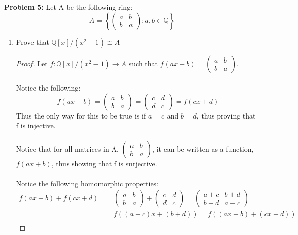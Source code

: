 \documentclass[12pt]{article}
\begin{document}
\noindent \textbf{Problem 5: }Let A be the following ring:
	$$
	A = \left\{
	\begin{pmatrix}
		a & b \\ b & a
	\end{pmatrix}: a,b \in \mathbb{Q}\right\}
	$$
\begin{enumerate}[label = (\alph*)]
	\item Prove that $\mathbb{Q}[x]/(x^2 - 1) \cong A$
	\begin{proof}
		Let $f:\mathbb{Q}[x]/(x^2 - 1) \rightarrow A$ such that $f(ax + b) = \begin{pmatrix}
			a & b \\ b & a
		\end{pmatrix}$.
		\\ \\
		Notice the following:
			$$
			f(ax + b) =
			\begin{pmatrix}
				a & b \\ b & a
			\end{pmatrix} = 
			\begin{pmatrix}
				c & d \\ d & c
			\end{pmatrix} = 
			f(cx + d)
			$$
		Thus the only way for this to be true is if $a=c$ and $b = d$, thus proving that f is injective.
		\\ \\
		Notice that for all matrices in A, 
		$
		\begin{pmatrix}
			a & b \\ b & a
		\end{pmatrix}
		$, it can be written as a function, $f(ax + b)$, thus showing that f is surjective.
		\\ \\
		Notice the following homomorphic properties:
			\begin{align*}
				f(ax + b) + f(cx + d) &= 
				\begin{pmatrix}
				a & b \\ b & a
				\end{pmatrix} +
				\begin{pmatrix}
				c & d \\ d & c
				\end{pmatrix} = 
				\begin{pmatrix}
				a+c & b+d \\ b+d & a+c
				\end{pmatrix} \\
				&= f((a+c)x + (b+d)) = f((ax+b) + (cx + d)) \\

\end{align*}
\end{proof}
\end{enumerate}
\end{document}
